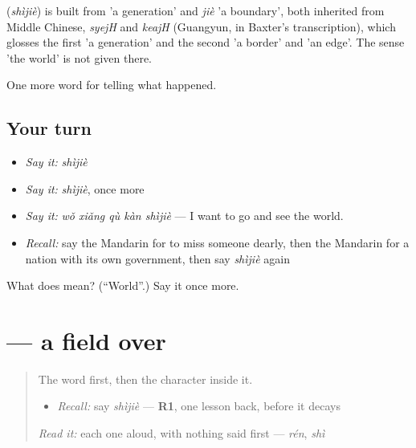 \begin{cousinweb}
\textbf{} (\emph{shìjiè}) is built from  'a generation' and \emph{jiè} 'a boundary', both inherited from Middle Chinese, \emph{syejH} and \emph{keajH} (Guangyun, in Baxter's transcription), which glosses the first 'a generation' and the second 'a border' and 'an edge'. The sense 'the world' is not given there.
\end{cousinweb}

\begin{grammarlens}[title={What you've built}]
One more word for telling what happened.
\end{grammarlens}

\subsection*{Your turn}
\begin{itemize}
\raggedright
  \item \emph{Say it:} \emph{shìjiè}
  \item \emph{Say it:} \emph{shìjiè}, once more
  \item \emph{Say it:} \emph{wǒ xiǎng qù kàn shìjiè} — I want to go and see the world.
  \item \emph{Recall:} say the Mandarin for to miss someone dearly, then the Mandarin for a nation with its own government, then say \emph{shìjiè} again
\end{itemize}

\begin{tcolorbox}[breakable,colback=teal!4,colframe=teal!35!black,title={Before you move on}]
What does  mean? (\textquotedblleft{}World\textquotedblright{}.) Say it once more.
\end{tcolorbox}
\section[\texorpdfstring{\zh{界} (jiè)}{界 (jiè)}]{ — a field over }

\label{lesson:ZH-W326-jie-boundary}



\begin{quote}
The word first, then the character inside it.

\begin{itemize}
\raggedright
  \item \emph{Recall:} say \emph{shìjiè} — \textbf{R1}, one lesson back, before it decays
\end{itemize}

\begin{quote}
 
\end{quote}

\emph{Read it:} each one aloud, with nothing said first — \emph{rén}, \emph{shì}
\end{quote}

